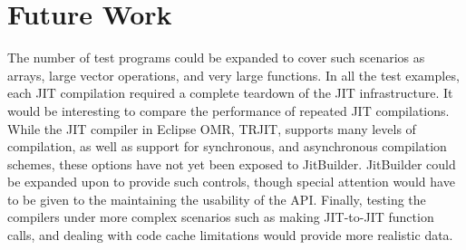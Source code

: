 \section{Future Work}
\label{sec:future-work}
The number of test programs could be expanded to cover such scenarios as arrays, large vector operations, and very large functions.
In all the test examples, each JIT compilation required a complete teardown of the JIT infrastructure. 
It would be interesting to compare the performance of repeated JIT compilations.
While the JIT compiler in Eclipse OMR, TRJIT, supports many levels of compilation, as well as support for synchronous, and asynchronous compilation schemes, these options have not yet been exposed to JitBuilder.
JitBuilder could be expanded upon to provide such controls, though special attention would have to be given to the maintaining the usability of the API.
Finally, testing the compilers under more complex scenarios such as making JIT-to-JIT function calls, and dealing with code cache limitations would provide more realistic data.